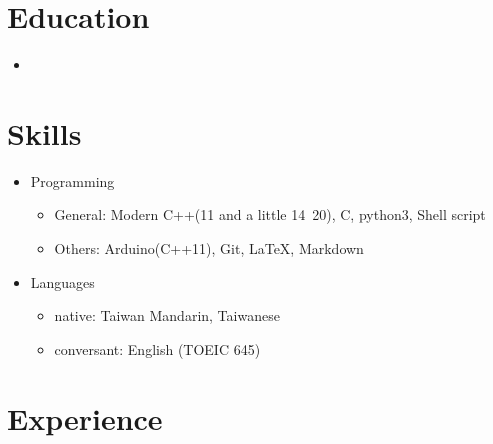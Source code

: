 \documentclass[11pt,a4paper,sans]{moderncv}
\begin{document}
\makecvtitle
\vspace{-20pt}
\section{Education}
\begin{itemize}
	\item{} \vspace{4pt}
\end{itemize}
	
\section{Skills}
\begin{itemize}
	\item Programming
	\begin{itemize}
		\item General: Modern C++(11 and a little 14~20), C, python3, Shell script
		\item Others: Arduino(C++11), Git, \LaTeX , Markdown
	\end{itemize}
	\item Languages
	\begin{itemize}
		\item native: Taiwan Mandarin, Taiwanese
		\item conversant: English (TOEIC 645)
	\end{itemize}
\end{itemize}
	
\section{Experience}

\vspace{4pt}
\end{document}
